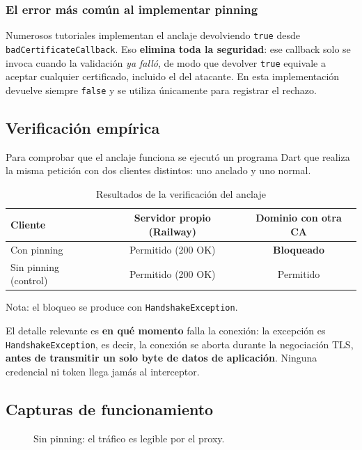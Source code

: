 \documentclass[12pt, a4paper]{article} %
\begin{document}
\subsubsection{El error más común al implementar pinning}
Numerosos tutoriales implementan el anclaje devolviendo \texttt{true} desde
\texttt{badCertificateCallback}. Eso \textbf{elimina toda la seguridad}: ese
callback solo se invoca cuando la validación \textit{ya falló}, de modo que
devolver \texttt{true} equivale a aceptar cualquier certificado, incluido el
del atacante. En esta implementación devuelve siempre \texttt{false} y se
utiliza únicamente para registrar el rechazo.

\subsection{Verificación empírica}
\label{sec:verificacion}
Para comprobar que el anclaje funciona se ejecutó un programa Dart que realiza
la misma petición con dos clientes distintos: uno anclado y uno normal.

\begin{table}[h]
    \centering
    \caption{Resultados de la verificación del anclaje}
    \label{tab:resultados}
    \begin{tabular}{lcc}
        \toprule
        \textbf{Cliente} & \textbf{Servidor propio (Railway)} & \textbf{Dominio con otra CA} \\
        \midrule
        Con pinning        & Permitido (200 OK) & \textbf{Bloqueado} \\
        Sin pinning (control) & Permitido (200 OK) & Permitido \\
        \bottomrule
    \end{tabular}
    \vspace{0.5em}
    \footnotesize Nota: el bloqueo se produce con \texttt{HandshakeException}.
\end{table}

El detalle relevante es \textbf{en qué momento} falla la conexión: la excepción
es \texttt{HandshakeException}, es decir, la conexión se aborta durante la
negociación TLS, \textbf{antes de transmitir un solo byte de datos de
aplicación}. Ninguna credencial ni token llega jamás al interceptor.

\subsection{Capturas de funcionamiento}

\begin{figure}[h]
    \centering
    \caption{Sin pinning: el tráfico es legible por el proxy.}
    \label{fig:sinpinning}
\end{figure}
\end{document}
